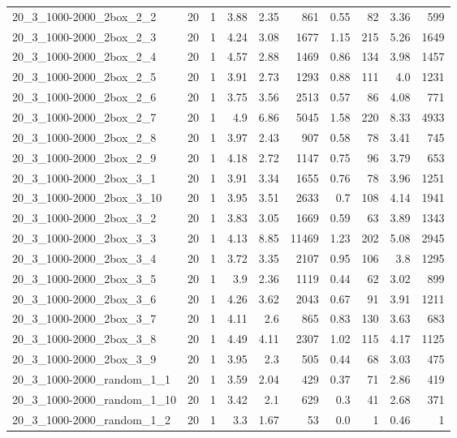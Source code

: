 \begin{center}
\begin{scriptsize}
\begin{longtable}{lrrrrrrrrr}
20\_3\_1000-2000\_2box\_2\_2 & 20 & 1 & 3.88 & 2.35 & 861 & 0.55 & 82 & 3.36 & 599\\
20\_3\_1000-2000\_2box\_2\_3 & 20 & 1 & 4.24 & 3.08 & 1677 & 1.15 & 215 & 5.26 & 1649\\
20\_3\_1000-2000\_2box\_2\_4 & 20 & 1 & 4.57 & 2.88 & 1469 & 0.86 & 134 & 3.98 & 1457\\
20\_3\_1000-2000\_2box\_2\_5 & 20 & 1 & 3.91 & 2.73 & 1293 & 0.88 & 111 & 4.0 & 1231\\
20\_3\_1000-2000\_2box\_2\_6 & 20 & 1 & 3.75 & 3.56 & 2513 & 0.57 & 86 & 4.08 & 771\\
20\_3\_1000-2000\_2box\_2\_7 & 20 & 1 & 4.9 & 6.86 & 5045 & 1.58 & 220 & 8.33 & 4933\\
20\_3\_1000-2000\_2box\_2\_8 & 20 & 1 & 3.97 & 2.43 & 907 & 0.58 & 78 & 3.41 & 745\\
20\_3\_1000-2000\_2box\_2\_9 & 20 & 1 & 4.18 & 2.72 & 1147 & 0.75 & 96 & 3.79 & 653\\
20\_3\_1000-2000\_2box\_3\_1 & 20 & 1 & 3.91 & 3.34 & 1655 & 0.76 & 78 & 3.96 & 1251\\
20\_3\_1000-2000\_2box\_3\_10 & 20 & 1 & 3.95 & 3.51 & 2633 & 0.7 & 108 & 4.14 & 1941\\
20\_3\_1000-2000\_2box\_3\_2 & 20 & 1 & 3.83 & 3.05 & 1669 & 0.59 & 63 & 3.89 & 1343\\
20\_3\_1000-2000\_2box\_3\_3 & 20 & 1 & 4.13 & 8.85 & 11469 & 1.23 & 202 & 5.08 & 2945\\
20\_3\_1000-2000\_2box\_3\_4 & 20 & 1 & 3.72 & 3.35 & 2107 & 0.95 & 106 & 3.8 & 1295\\
20\_3\_1000-2000\_2box\_3\_5 & 20 & 1 & 3.9 & 2.36 & 1119 & 0.44 & 62 & 3.02 & 899\\
20\_3\_1000-2000\_2box\_3\_6 & 20 & 1 & 4.26 & 3.62 & 2043 & 0.67 & 91 & 3.91 & 1211\\
20\_3\_1000-2000\_2box\_3\_7 & 20 & 1 & 4.11 & 2.6 & 865 & 0.83 & 130 & 3.63 & 683\\
20\_3\_1000-2000\_2box\_3\_8 & 20 & 1 & 4.49 & 4.11 & 2307 & 1.02 & 115 & 4.17 & 1125\\
20\_3\_1000-2000\_2box\_3\_9 & 20 & 1 & 3.95 & 2.3 & 505 & 0.44 & 68 & 3.03 & 475\\
20\_3\_1000-2000\_random\_1\_1 & 20 & 1 & 3.59 & 2.04 & 429 & 0.37 & 71 & 2.86 & 419\\
20\_3\_1000-2000\_random\_1\_10 & 20 & 1 & 3.42 & 2.1 & 629 & 0.3 & 41 & 2.68 & 371\\
20\_3\_1000-2000\_random\_1\_2 & 20 & 1 & 3.3 & 1.67 & 53 & 0.0 & 1 & 0.46 & 1\\

\end{longtable}
\end{scriptsize}
\end{center}
